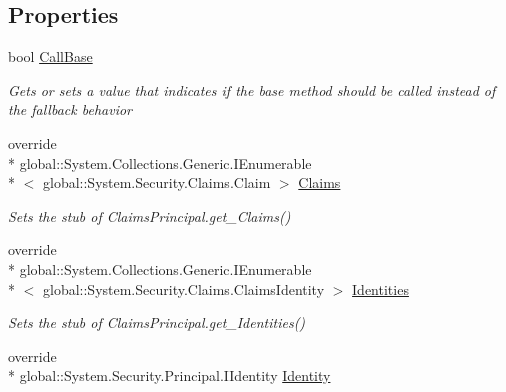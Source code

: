 \subsection*{Properties}
\begin{DoxyCompactItemize}
\item 
bool \hyperlink{class_system_1_1_security_1_1_claims_1_1_fakes_1_1_stub_claims_principal_ab1f570aa8a013d230a70a2263343c6c5}{Call\-Base}
\begin{DoxyCompactList}\small\item\em Gets or sets a value that indicates if the base method should be called instead of the fallback behavior\end{DoxyCompactList}\item 
override \\*
global\-::\-System.\-Collections.\-Generic.\-I\-Enumerable\\*
$<$ global\-::\-System.\-Security.\-Claims.\-Claim $>$ \hyperlink{class_system_1_1_security_1_1_claims_1_1_fakes_1_1_stub_claims_principal_add2ac3a8268d0a3eabfa120470dd5377}{Claims}
\begin{DoxyCompactList}\small\item\em Sets the stub of Claims\-Principal.\-get\-\_\-\-Claims()\end{DoxyCompactList}\item 
override \\*
global\-::\-System.\-Collections.\-Generic.\-I\-Enumerable\\*
$<$ global\-::\-System.\-Security.\-Claims.\-Claims\-Identity $>$ \hyperlink{class_system_1_1_security_1_1_claims_1_1_fakes_1_1_stub_claims_principal_aeb24f4e5c6f0bd1f03517ad36aaf6d4b}{Identities}
\begin{DoxyCompactList}\small\item\em Sets the stub of Claims\-Principal.\-get\-\_\-\-Identities()\end{DoxyCompactList}\item 
override \\*
global\-::\-System.\-Security.\-Principal.\-I\-Identity \hyperlink{class_system_1_1_security_1_1_claims_1_1_fakes_1_1_stub_claims_principal_a031505fd00f082a3d01e081cd5706e27}{Identity}

\end{DoxyCompactItemize}
